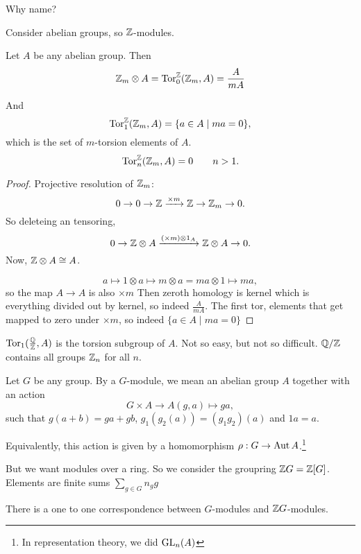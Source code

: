 Why name? 

Consider abelian groups, so $\mathbb{Z}$-modules.

\begin{eg}
    Let $A$ be any abelian group. Then
    \[\mathbb{Z}_m \otimes A = \operatorname{Tor}_0^{\mathbb{Z}} (\mathbb{Z}_m, A) = \frac{A}{mA}\]

    And
    \[
        \operatorname{Tor}_{1}^{\mathbb{Z}}(\mathbb{Z}_m, A) = \{a \in A  \mid  m a = 0\},
    \] 
    which is the set of $m$-torsion elements of $A$.
    \[
        \operatorname{Tor}_n^{\mathbb{Z}}(\mathbb{Z}_m, A) = 0 \qquad n > 1
    .\] 
\end{eg}
\begin{proof}
    Projective resolution of $\mathbb{Z}_m$:
    \[
        0 \to  0\to  \mathbb{Z} \xrightarrow{\times m}   \mathbb{Z} \to  \mathbb{Z}_m \to  0
    .\] 
    So deleteing an tensoring,
    \[
        0 \to  \mathbb{Z}\otimes A \xrightarrow{(\times m) \otimes 1_A}   \mathbb{Z} \otimes A \to  0
    .\] 
    Now, $\mathbb{Z} \otimes A\cong A$.

    \[
        a \mapsto 1 \otimes a \mapsto  m \otimes a = m a \otimes 1 \mapsto ma
    ,\] 
    so the map $A \to  A$ is also $\times  m$
    Then zeroth homology is kernel which is everything divided out by kernel, so indeed $\frac{A}{mA}$.
    The first tor, elements that get mapped to zero under $\times  m$, so indeed $\{ a \in A  \mid  m a = 0\} $
\end{proof}

\begin{remark}
    $\operatorname{Tor}_1(\frac{\mathbb{Q}}{\mathbb{Z}}, A)$ is the torsion subgroup of $A$.
    Not so easy, but not so difficult.
     $\mathbb{Q} / \mathbb{Z}$ contains all groups $\mathbb{Z}_n$ for all $n$.
\end{remark}

\begin{definition}
Let $G$ be any group.
By a $G$-module, we mean an abelian group $A$ together with an action
 \[
     G  \times  A \to  A (g, a) \mapsto  ga
,\] 
such that $g(a+b) = ga + gb$,  $g_1(g_2(a)) = (g_1g_2)(a)$ and $1a = a$.
\end{definition}

Equivalently, this action is given by a homomorphism $\rho: G \to  \operatorname{Aut} A$.\footnote{In representation theory, we did $\operatorname{GL}_n(A)$}

But we want modules over a ring.
So we consider the groupring $\mathbb{Z} G = \mathbb{Z}[G]$.
Elements are finite sums $\sum_{g \in G} n_g g$

There is a one to one correspondence between $G$-modules  and $ \mathbb{Z} G$-modules.


